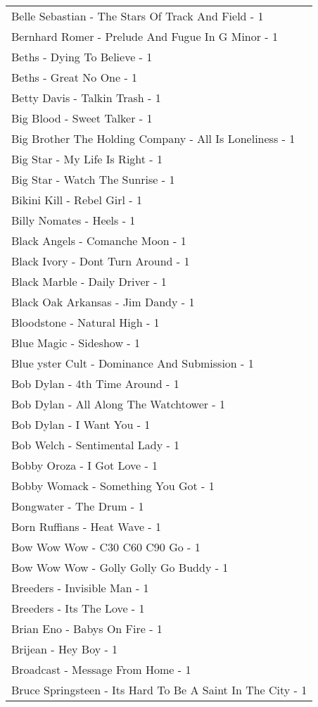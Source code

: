 \documentclass[
]{article}
\begin{document}
\begin{longtable}{l}
Belle Sebastian - The Stars Of Track And Field - 1 \\ 
Bernhard Romer - Prelude And Fugue In G Minor - 1 \\ 
Beths - Dying To Believe - 1 \\ 
Beths - Great No One - 1 \\ 
Betty Davis - Talkin Trash - 1 \\ 
Big Blood - Sweet Talker - 1 \\ 
Big Brother The Holding Company - All Is Loneliness - 1 \\ 
Big Star - My Life Is Right - 1 \\ 
Big Star - Watch The Sunrise - 1 \\ 
Bikini Kill - Rebel Girl - 1 \\ 
Billy Nomates - Heels - 1 \\ 
Black Angels - Comanche Moon - 1 \\ 
Black Ivory - Dont Turn Around - 1 \\ 
Black Marble - Daily Driver - 1 \\ 
Black Oak Arkansas - Jim Dandy - 1 \\ 
Bloodstone - Natural High - 1 \\ 
Blue Magic - Sideshow - 1 \\ 
Blue yster Cult - Dominance And Submission - 1 \\ 
Bob Dylan - 4th Time Around - 1 \\ 
Bob Dylan - All Along The Watchtower - 1 \\ 
Bob Dylan - I Want You - 1 \\ 
Bob Welch - Sentimental Lady - 1 \\ 
Bobby Oroza - I Got Love - 1 \\ 
Bobby Womack - Something You Got - 1 \\ 
Bongwater - The Drum - 1 \\ 
Born Ruffians - Heat Wave - 1 \\ 
Bow Wow Wow - C30 C60 C90 Go - 1 \\ 
Bow Wow Wow - Golly Golly Go Buddy - 1 \\ 
Breeders - Invisible Man - 1 \\ 
Breeders - Its The Love - 1 \\ 
Brian Eno - Babys On Fire - 1 \\ 
Brijean - Hey Boy - 1 \\ 
Broadcast - Message From Home - 1 \\ 
Bruce Springsteen - Its Hard To Be A Saint In The City - 1 \\ 

\end{longtable}
\end{document}
